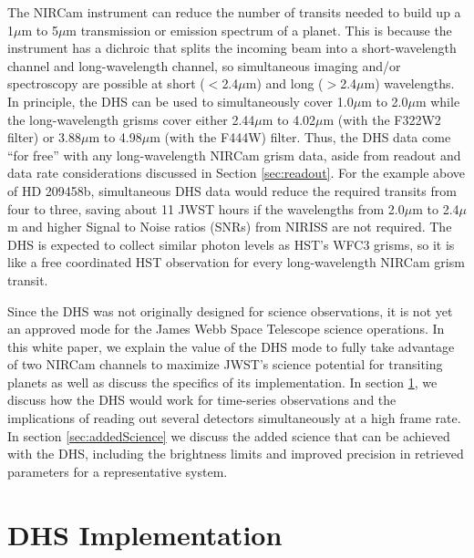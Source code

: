 \documentclass[iop]{emulateapj}
\begin{document}
The NIRCam instrument can reduce the number of transits needed to build up a 1$\mu$m to 5$\mu$m transmission or emission spectrum of a planet.
This is because the instrument has a dichroic that splits the incoming beam into a short-wavelength channel and long-wavelength channel, so simultaneous imaging and/or spectroscopy are possible at short ($<$2.4$\mu$m) and long ($>$2.4$\mu$m) wavelengths.
In principle, the DHS can be used to simultaneously cover 1.0$\mu$m to 2.0$\mu$m while the long-wavelength grisms cover either 2.44$\mu$m to 4.02$\mu$m (with the F322W2 filter) or 3.88$\mu$m to 4.98$\mu$m (with the F444W) filter.
Thus, the DHS data come ``for free'' with any long-wavelength NIRCam grism data, aside from readout and data rate considerations discussed in Section \ref{sec:readout}.
For the example above of HD 209458b, simultaneous DHS data would reduce the required transits from four to three, saving about 11 JWST hours 
if the wavelengths from 2.0$\mu$m to 2.4$\mu$m and higher Signal to Noise ratios (SNRs) from NIRISS are not required.
The DHS is expected to collect similar photon levels as HST's WFC3 grisms, so it is like a free coordinated HST observation for every long-wavelength NIRCam grism transit.

Since the DHS was not originally designed for science observations, it is not yet an approved mode for the James Webb Space Telescope science operations.
In this white paper, we explain the value of the DHS mode to fully take advantage of two NIRCam channels to maximize JWST's science potential for transiting planets as well as discuss the specifics of its implementation.
In section \ref{sec:implementation}, we discuss how the DHS would work for time-series observations and the implications of reading out several detectors simultaneously at a high frame rate.
In section \ref{sec:addedScience} we discuss the added science that can be achieved with the DHS, including the brightness limits and improved precision in retrieved parameters for a representative system.

\section{DHS Implementation}\label{sec:implementation}
\end{document}
